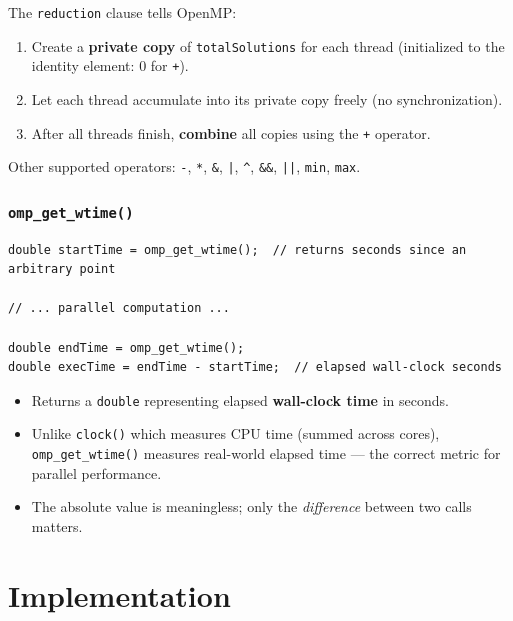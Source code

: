 \documentclass[11pt]{article}
\begin{document}
The \texttt{reduction} clause tells OpenMP:
\begin{enumerate}
    \item Create a \textbf{private copy} of \texttt{totalSolutions} for each thread (initialized to the identity element: $0$ for \texttt{+}).
    \item Let each thread accumulate into its private copy freely (no synchronization).
    \item After all threads finish, \textbf{combine} all copies using the \texttt{+} operator.
\end{enumerate}
Other supported operators: \texttt{-}, \texttt{*}, \texttt{\&}, \texttt{|}, \texttt{\^{}}, \texttt{\&\&}, \texttt{||}, \texttt{min}, \texttt{max}.

\subsubsection{\texttt{omp\_get\_wtime()}}

\begin{codebox}
\begin{lstlisting}
double startTime = omp_get_wtime();  // returns seconds since an arbitrary point

// ... parallel computation ...

double endTime = omp_get_wtime();
double execTime = endTime - startTime;  // elapsed wall-clock seconds
\end{lstlisting}
\end{codebox}

\begin{itemize}
    \item Returns a \texttt{double} representing elapsed \textbf{wall-clock time} in seconds.
    \item Unlike \texttt{clock()} which measures CPU time (summed across cores), \texttt{omp\_get\_wtime()} measures real-world elapsed time --- the correct metric for parallel performance.
    \item The absolute value is meaningless; only the \textit{difference} between two calls matters.
\end{itemize}

\newpage

\section{Implementation}
\end{document}
